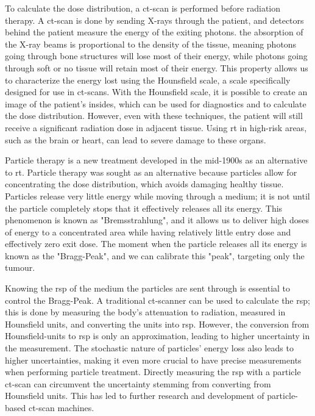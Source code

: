 \documentclass[main.tex]{subfiles}
\begin{document}
To calculate the dose distribution, a \gls{ct}-scan is performed before radiation therapy. A \gls{ct}-scan is done by sending X-rays through the patient, and detectors behind the patient measure the energy of the exiting photons. the absorption of the X-ray beams is proportional to the density of the tissue, meaning photons going through bone structures will lose most of their energy, while photons going through soft or no tissue will retain most of their energy. This property allows us to characterize the energy lost using the Hounsfield scale, a scale specifically designed for use in \gls{ct}-scans. With the Hounsfield scale, it is possible to create an image of the patient's insides, which can be used for diagnostics and to calculate the dose distribution. However, even with these techniques, the patient will still receive a significant radiation dose in adjacent tissue. Using \gls{rt} in high-risk areas, such as the brain or heart, can lead to severe damage to these organs.  \par

Particle therapy is a new treatment developed in the mid-1900s as an alternative to \gls{rt}. Particle therapy was sought as an alternative because particles allow for concentrating the dose distribution, which avoids damaging healthy tissue. Particles release very little energy while moving through a medium; it is not until the particle completely stops that it effectively releases all its energy. This phenomenon is known as "Bremsstrahlung", and it allows us to deliver high doses of energy to a concentrated area while having relatively little entry dose and effectively zero exit dose. The moment when the particle releases all its energy is known as the "Bragg-Peak", and we can calibrate this "peak", targeting only the tumour.

Knowing the \gls{rsp} of the medium the particles are sent through is essential to control the Bragg-Peak. A traditional \gls{ct}-scanner can be used to calculate the \gls{rsp}; this is done by measuring the body's attenuation to radiation, measured in Hounsfield units, and converting the units into \gls{rsp}. However, the conversion from Hounsfield-units to \gls{rsp} is only an approximation, leading to higher uncertainty in the measurement. The stochastic nature of particles' energy loss also leads to higher uncertainties, making it even more crucial to have precise measurements when performing particle treatment. Directly measuring the \gls{rsp} with a particle \gls{ct}-scan can circumvent the uncertainty stemming from converting from Hounsfield units. This has led to further research and development of particle-based \gls{ct}-scan machines.
\end{document}
